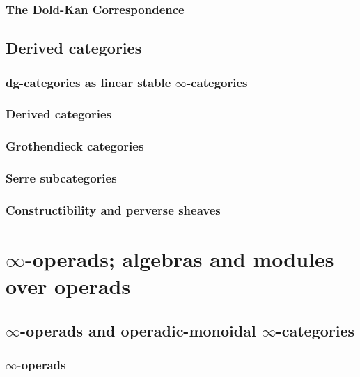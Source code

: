             \subsubsection{The Dold-Kan Correspondence}
            
        \subsection{Derived categories}
            \subsubsection{dg-categories as linear stable \texorpdfstring{$\infty$}{}-categories}
            
            \subsubsection{Derived categories}
            
            \subsubsection{Grothendieck categories}
            
            \subsubsection{Serre subcategories}
        
            \subsubsection{Constructibility and perverse sheaves}
    
    \section{\texorpdfstring{$\infty$}{}-operads; algebras and modules over operads} \label{section: algebras_and_modules_over_operads}
        \subsection{\texorpdfstring{$\infty$}{}-operads and operadic-monoidal \texorpdfstring{$\infty$}{}-categories} \label{subsection: operads}
            \subsubsection{\texorpdfstring{$\infty$}{}-operads}
            

